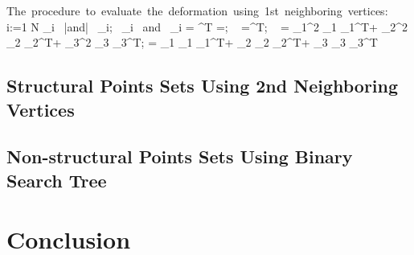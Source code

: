 \documentclass{llncs}
\begin{document}
\begin{program}
 \mbox{The procedure to evaluate the deformation using 1st neighboring vertices:}
\BEGIN \\ %
  \FOR i:=1 \TO N \DO {}
     _i \ |and| \ _i; \ _i \ and \ _i
      = ^T =;  \ 
     =^T;  \  
      =  \widetilde{\lambda}_1^2 _1 _1^T+ \widetilde{\lambda}_2^2 _2 _2^T+ \widetilde{\lambda}_3^2 _3 _3^T; 
      =  \widetilde{\lambda}_1 _1 _1^T+ \widetilde{\lambda}_2 _2 _2^T+ \widetilde{\lambda}_3 _3 _3^T\ENDPROC {} \  
\END
\end{program}

\subsection{Structural Points Sets Using 2nd Neighboring Vertices}

\subsection{Non-structural Points Sets Using Binary Search Tree}


\section{Conclusion}


%

%
%


%
\end{document}

